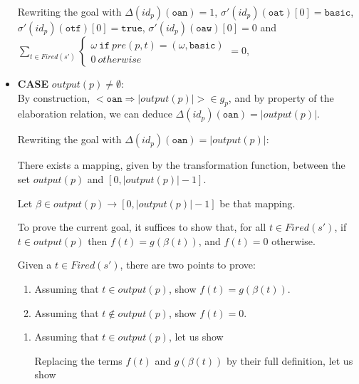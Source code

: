 \documentclass[dvipsnames,12pt]{article}
\begin{document}
\begin{niproof}
\begin{itemize}
   \noindent{}Rewriting the goal with $\Delta(id_p)(\texttt{oan})=1$,
   $\sigma'(id_p)(\texttt{oat})[0]=\mathtt{basic}$,
   $\sigma'(id_p)(\texttt{otf})[0]=\mathtt{true}$,
   $\sigma'(id_p)(\texttt{oaw})[0]=0$ and $\sum\limits_{t\in{}Fired(s')}
   \begin{cases}
     \omega~\mathtt{if}~pre(p,t)=(\omega,\mathtt{basic}) \\
     0~otherwise
   \end{cases}=0$, 
   
 \item \textbf{CASE} $output(p)\neq\emptyset$:\\

   \noindent{}By construction,
   ${<}\mathtt{oan\Rightarrow{}}\vert{}output(p)\vert{>}\in{}g_p$, and
   by property of the elaboration relation, we can deduce
   $\Delta(id_p)(\texttt{oan})=\vert{}output(p)\vert$.
   
   Rewriting the goal with
   $\Delta(id_p)(\texttt{oan})=\vert{}output(p)\vert$:

   There exists a mapping, given by the transformation function,
   between the set $output(p)$ and $[0,\vert{}output(p)\vert-1]$.

   Let $\beta\in{}output(p)\rightarrow[0,\vert{}output(p)\vert-1]$ be
   that mapping.

   To prove the current goal, it suffices to show that, for all
   $t\in{}Fired(s')$, if $t\in{}output(p)$ then $f(t)=g(\beta(t))$,
   and $f(t)=0$ otherwise.

   Given a $t\in{}Fired(s')$, there are two points to prove:

   \begin{enumerate}
   \item Assuming that $t\in{}output(p)$, show $f(t)=g(\beta(t))$.
   \item Assuming that $t\notin{}output(p)$, show $f(t)=0$.
   \end{enumerate}

   \begin{enumerate}
   \item Assuming that $t\in{}output(p)$, let us show

     Replacing the terms $f(t)$ and $g(\beta(t))$ by their full
     definition, let us show


\end{enumerate}
\end{itemize}
\end{niproof}
\end{document}
